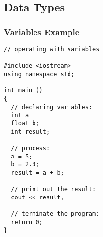\documentclass{beamer}
\newtheorem{Key points}{Key points}
\newcommand\Fontviaa{\fontsize{8}{7.2}\selectfont}
\begin{document}
\subsection{Data Types}
\begin{frame}[fragile]
\frametitle{Variables Example}
\Fontviaa
\begin{lstlisting}
// operating with variables

#include <iostream>
using namespace std;

int main ()
{
  // declaring variables:
  int a
  float b;
  int result;

  // process:
  a = 5;
  b = 2.3;
  result = a + b;

  // print out the result:
  cout << result;

  // terminate the program:
  return 0;
}
\end{lstlisting}
\end{frame}
\end{document}
